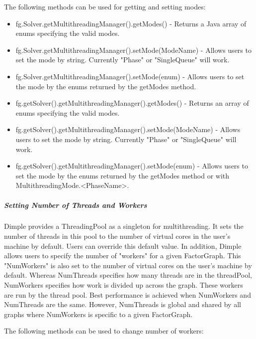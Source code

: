 The following methods can be used for getting and setting modes:


\ifmatlab

\begin{itemize}
\item fg.Solver.getMultithreadingManager().getModes() - Returns a Java array of enums specifying the valid modes.
\item fg.Solver.getMultithreadingManager().setMode(ModeName) - Allows users to set the mode by string.  Currently "Phase" or "SingleQueue" will work.
\item fg.Solver.getMultithreadingManager().setMode(enum) - Allows users to set the mode by the enums returned by the getModes method.
\end{itemize}

\fi

\ifjava
\begin{itemize}
\item fg.getSolver().getMultithreadingManager().getModes() - Returns an array of enums specifying the valid modes.
\item fg.getSolver().getMultithreadingManager().setMode(ModeName) - Allows users to set the mode by string.  Currently "Phase" or "SingleQueue" will work.
\item fg.getSolver().getMultithreadingManager().setMode(enum) - Allows users to set the mode by the enums returned by the getModes method or with MultithreadingMode.<PhaseName>.
\end{itemize}
\fi

\subparagraph{Setting Number of Threads and Workers}

Dimple provides a ThreadingPool as a singleton for multithreading.  It sets the number of threads in this pool to the number of virtual cores in the user's machine by default.  Users can override this default value.  In addition, Dimple allows users to specify the number of "workers" for a given FactorGraph.  This "NumWorkers" is also set to the number of virtual cores on the user's machine by default.  Whereas NumThreads specifies how many threads are in the threadPool, NumWorkers specifies how work is divided up across the graph.  These workers are run by the thread pool.  Best performance is achieved when NumWorkers and NumThreads are the same.  However, NumThreads is global and shared by all graphs where NumWorkers is specific to a given FactorGraph.

The following methods can be used to change number of workers:

